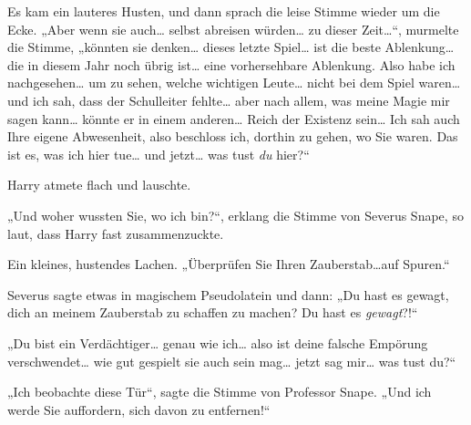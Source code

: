 Es kam ein lauteres Husten, und dann sprach die leise Stimme wieder um die Ecke.
„Aber wenn sie auch… selbst abreisen würden… zu dieser Zeit…“, murmelte die Stimme, „könnten sie denken… dieses letzte Spiel… ist die beste Ablenkung… die in diesem Jahr noch übrig ist… eine vorhersehbare Ablenkung. Also habe ich nachgesehen… um zu sehen, welche wichtigen Leute… nicht bei dem Spiel waren… und ich sah, dass der Schulleiter fehlte… aber nach allem, was meine Magie mir sagen kann… könnte er in einem anderen… Reich der Existenz sein… Ich sah auch Ihre eigene Abwesenheit, also beschloss ich, dorthin zu gehen, wo Sie waren. Das ist es, was ich hier tue… und jetzt… was tust \emph{du} hier?“

Harry atmete flach und lauschte.

„Und woher wussten Sie, wo ich bin?“, erklang die Stimme von Severus Snape, so laut, dass Harry fast zusammenzuckte.

Ein kleines, hustendes Lachen.
„Überprüfen Sie Ihren Zauberstab…auf Spuren.“

Severus sagte etwas in magischem Pseudolatein und dann:
„Du hast es gewagt, dich an meinem Zauberstab zu schaffen zu machen? Du hast es \emph{gewagt}?!“

„Du bist ein Verdächtiger… genau wie ich… also ist deine falsche Empörung verschwendet… wie gut gespielt sie auch sein mag… jetzt sag mir… was tust du?“

„Ich beobachte diese Tür“, sagte die Stimme von Professor Snape.
„Und ich werde Sie auffordern, sich davon zu entfernen!“

